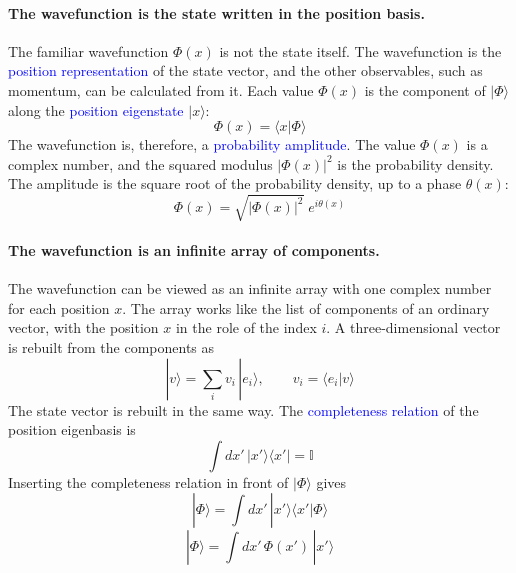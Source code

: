 \documentclass[11pt]{article}      %
\numberwithin{equation}{section}   %
\begin{document}
\paragraph{The wavefunction is the state written in the position basis.} The familiar wavefunction $\Phi(x)$ is not the state itself. The wavefunction is the \textcolor{blue}{position representation} of the state vector, and the other observables, such as momentum, can be calculated from it. Each value $\Phi(x)$ is the component of $|\Phi\rangle$ along the \textcolor{blue}{position eigenstate} $|x\rangle$:
\begin{equation}
    \boxed{\Phi(x) = \langle x | \Phi \rangle}
\end{equation}
The wavefunction is, therefore, a \textcolor{blue}{probability amplitude}. The value $\Phi(x)$ is a complex number, and the squared modulus $|\Phi(x)|^2$ is the probability density. The amplitude is the square root of the probability density, up to a phase $\theta(x)$:
\begin{equation*}
    \Phi(x) = \sqrt{|\Phi(x)|^2}\; e^{i\theta(x)}
\end{equation*}

\paragraph{The wavefunction is an infinite array of components.} The wavefunction can be viewed as an infinite array with one complex number for each position $x$. The array works like the list of components of an ordinary vector, with the position $x$ in the role of the index $i$. A three-dimensional vector is rebuilt from the components as
\begin{equation*}
    |v\rangle = \sum_i v_i\, |e_i\rangle, \qquad v_i = \langle e_i | v \rangle
\end{equation*}
The state vector is rebuilt in the same way. The \textcolor{blue}{completeness relation} of the position eigenbasis is
\begin{equation*}
    \int dx'\, |x'\rangle\langle x'| = \mathbb{I}
\end{equation*}
Inserting the completeness relation in front of $|\Phi\rangle$ gives
\begin{equation*}
    |\Phi\rangle = \int dx'\, |x'\rangle\langle x' | \Phi \rangle
\end{equation*}
\begin{equation}
    \boxed{|\Phi\rangle = \int dx'\, \Phi(x')\, |x'\rangle}
\end{equation}
\end{document}
